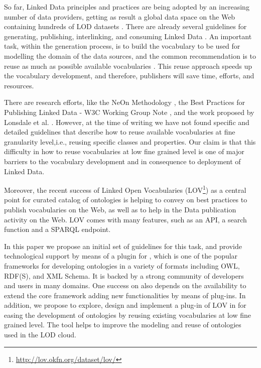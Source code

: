 So far, Linked Data principles and practices are being adopted by an increasing number of data providers, getting as result a global data space on the Web containing hundreds of LOD datasets \cite{Heath_Bizer_2011}. There are already several guidelines for generating, publishing, interlinking, and consuming Linked Data \cite{Heath_Bizer_2011}. An important task, within the generation process, is to build the vocabulary to be used for modelling the domain of the data sources, and the common recommendation is to reuse as much as possible available vocabularies \cite{Heath_Bizer_2011,hyland14}. This reuse approach speeds up the vocabulary development, and therefore, publishers will save time, efforts, and resources. 

There are research efforts, like the NeOn Methodology \cite{suarezfigueroa2012ontology}, the Best Practices for Publishing Linked Data - W3C Working Group Note \cite{hyland14}, and the work proposed by Lonsdale et al. \cite{Lonsdale2010318}. However, at the time of writing we have not found specific and detailed guidelines that describe how to reuse available vocabularies at fine granularity level,i.e., reusing specific classes and properties. Our claim is that this difficulty in how to reuse vocabularies at low fine grained level is one of major barriers to the vocabulary development and in consequence to deployment of Linked Data.

Moreover, the recent success of Linked Open Vocabularies (LOV\footnote{\url{http://lov.okfn.org/dataset/lov/}}) as a central point for curated catalog of ontologies is helping to convey on best practices to publish vocabularies on the Web, as well as to help in the Data publication activity on the Web. LOV comes with many features, such as an API, a search function and a SPARQL endpoint.

In this paper we propose an initial set of guidelines for this task, and provide technological support by means of a plugin for \protege, which is one of the popular frameworks for developing ontologies in a variety of formats including OWL, RDF(S), and XML Schema. It is backed by a strong community of developers and users in many domains. One success on \protege also depends on the availability to extend the core framework adding new functionalities by means of plug-ins. In addition, we propose to explore, design and implement a plug-in of LOV in \protege for easing the development of ontologies by reusing existing vocabularies at low fine grained level. The tool helps to improve the modeling and reuse of ontologies used in the LOD cloud.

